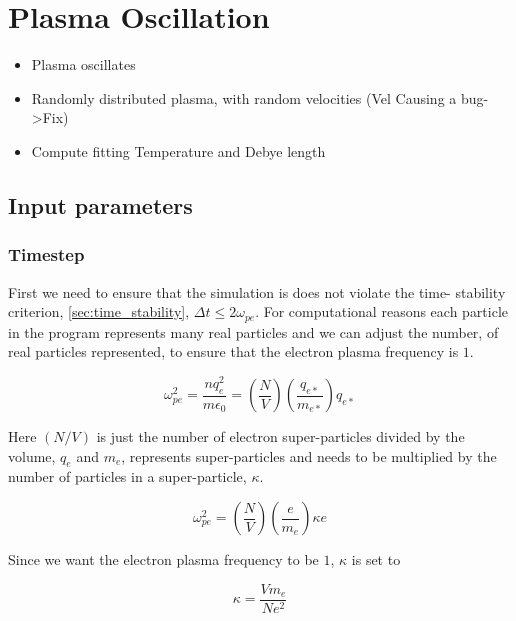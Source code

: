 \section{Plasma Oscillation}
\begin{itemize}
    \item Plasma oscillates
    \item Randomly distributed plasma, with random velocities (Vel Causing a bug->Fix)
    \item Compute fitting Temperature and Debye length
\end{itemize}

    \subsection{Input parameters}
        \subsubsection{Timestep}
        First we need to ensure that the simulation is does not violate the time-
        stability criterion, \cref{sec:time_stability}, \(\Delta t \leq 2\omega_{pe}\).
        For computational reasons each particle in the program represents many real particles
        and we can adjust the number, of real particles represented, to ensure
        that the electron plasma frequency is \(1\).

        \begin{equation}
            \omega_{pe}^2 = \frac{nq^2_e}{m\epsilon_0} = \left(\frac{N}{V}\right)\left(\frac{q_{e*}}{m_{e*} }\right)q_{e*}
        \end{equation}

        Here \((N/V)\) is just the number of electron super-particles divided by the volume,
        \(q_e\) and \(m_e\), represents super-particles and needs to be multiplied by the number
        of particles in a super-particle, \(\kappa\).

        \begin{equation}
            \omega_{pe}^2 = \left(\frac{N}{V}\right)\left(\frac{e}{m_e}\right)\kappa e
        \end{equation}

        Since we want the electron plasma frequency to be \(1\), \(\kappa\) is set to

        \begin{equation}
            \kappa = \frac{Vm_e}{Ne^2}
        \end{equation}

